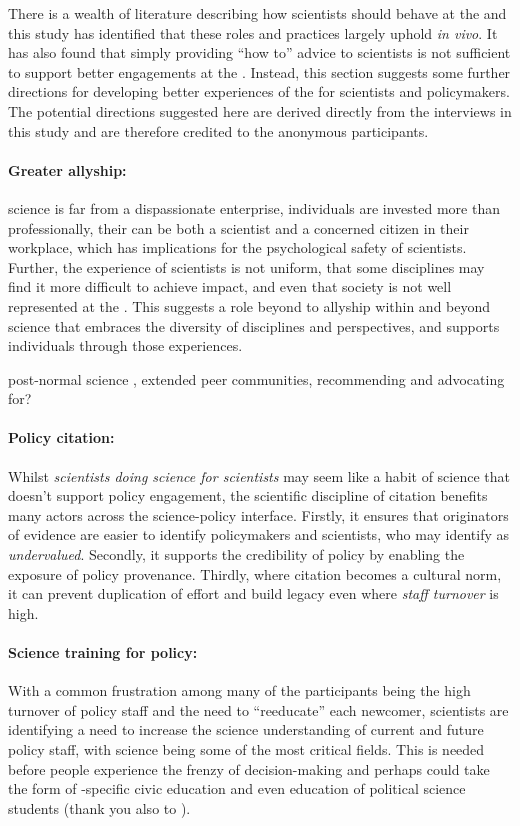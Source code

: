 There is a wealth of literature describing how scientists should behave at the \SPI{} and this study has identified that these roles and practices largely uphold \emph{in vivo}. It has also found that simply providing ``how to'' advice to scientists is not sufficient to support better engagements at the \SPI. Instead, this section suggests some further directions for developing better experiences of the \SPI{} for scientists and policymakers. The potential directions suggested here are derived directly from the interviews in this study and are therefore credited to the anonymous participants.

\paragraph{Greater allyship:}
\CAN{} science is far from a dispassionate enterprise, individuals are invested more than professionally, their \skirole{} can be both a scientist and a concerned citizen in their workplace, which has implications for the psychological safety of scientists. Further, the experience of scientists is not uniform, that some disciplines may find it more difficult to achieve impact, and even that society is not well represented at the \SPI{}. This suggests a role beyond \skinetw{} to allyship within and beyond science that embraces the diversity of disciplines and perspectives, and supports individuals through those experiences. 

post-normal science \cite{FuntowiczR1993}, extended peer communities, \cite{Jasanoff2003} recommending and advocating for? 


\paragraph{Policy citation:}
Whilst \emph{scientists doing science for scientists} may seem like a habit of science \skiinst{} that doesn't support policy engagement, the scientific discipline of citation benefits many actors across the science-policy interface. Firstly, it ensures that originators of evidence are easier to identify policymakers and scientists, who may identify as \emph{undervalued}. Secondly, it supports the credibility of policy by enabling the exposure of policy provenance. Thirdly, where citation becomes a cultural norm, it can prevent duplication of effort and build legacy even where \emph{staff turnover} is high.

\paragraph{Science training for policy:}
With a common frustration among many of the participants being the high turnover of policy staff and the need to ``reeducate'' each newcomer, scientists are identifying a need to increase the science understanding of current and future policy staff, with \CAN{} science being some of the most critical fields. This is needed before people experience the frenzy of decision-making and perhaps could take the form of \CAN-specific civic education and even education of political science students (thank you also to \cite{DykeM2024}).

